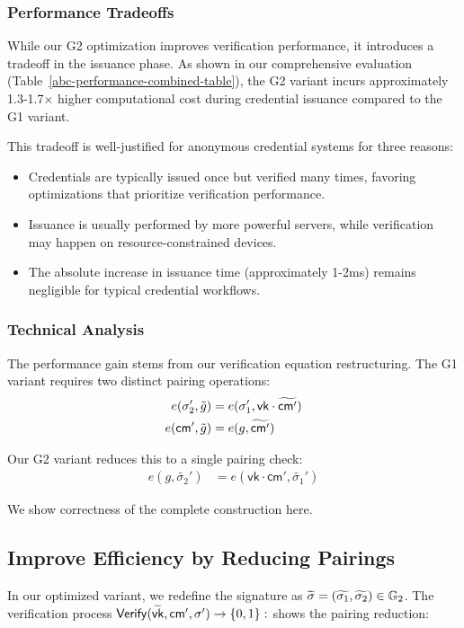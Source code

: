 \subsubsection{Performance Tradeoffs}
While our G2 optimization improves verification performance, it introduces a tradeoff in the issuance phase. As shown in our comprehensive evaluation (Table~\ref{abc-performance-combined-table}), the G2 variant incurs approximately 1.3-1.7× higher computational cost during credential issuance compared to the G1 variant.

This tradeoff is well-justified for anonymous credential systems for three reasons:
\begin{itemize}
    \item Credentials are typically issued once but verified many times, favoring optimizations that prioritize verification performance.
    \item Issuance is usually performed by more powerful servers, while verification may happen on resource-constrained devices.
    \item The absolute increase in issuance time (approximately 1-2ms) remains negligible for typical credential workflows.
\end{itemize}

\subsubsection{Technical Analysis}
The performance gain stems from our verification equation restructuring. The G1 variant requires two distinct pairing operations:
\begin{align}
e(\sigma_2', \tilde{g}) &= e(\sigma_1', \mathsf{vk} \cdot \widetilde{\mathsf{cm}'}) \\
e(\mathsf{cm}', \tilde{g}) &= e(g, \widetilde{\mathsf{cm}'})
\end{align}

Our G2 variant reduces this to a single pairing check:
\begin{align}
e(g, \widetilde{\sigma_2}') &= e(\mathsf{vk} \cdot \mathsf{cm}',\widetilde{\sigma_1}')
\end{align}

We show correctness of the complete construction here.

\subsection{Improve Efficiency by Reducing Pairings}\label{rerandsig_g2}
In our optimized variant, we redefine the signature as $\widetilde{\sigma} = (\widetilde{\sigma_1}, \widetilde{\sigma_2}) \in \mathbb{G}_2$. The verification process $\mathsf{Verify}(\widetilde{\mathsf{vk}}, \mathsf{cm}', {\sigma}') \to \{0,1\}:$ shows the pairing reduction:

